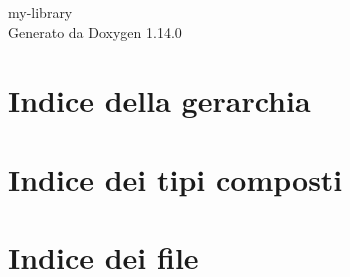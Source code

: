 \documentclass[twoside]{book}
\newcommand{\+}{\discretionary{\mbox{\scriptsize$\hookleftarrow$}}{}{}}
\newcommand{\clearemptydoublepage}{%
    \newpage{\pagestyle{empty}\cleardoublepage}%
  }
\begin{document}
  \raggedbottom
    \hypersetup{pageanchor=false,
                bookmarksnumbered=true,
                pdfencoding=unicode
               }
  \begin{titlepage}
  \vspace*{7cm}
  \begin{center}%
  {\Large my-\/library}\\
  \vspace*{1cm}
  {\large Generato da Doxygen 1.14.0}\\
  \end{center}
  \end{titlepage}
  \clearemptydoublepage
  \tableofcontents
  \clearemptydoublepage
  \hypersetup{pageanchor=true}
\chapter{Indice della gerarchia}

\chapter{Indice dei tipi composti}

\chapter{Indice dei file}

\end{document}
